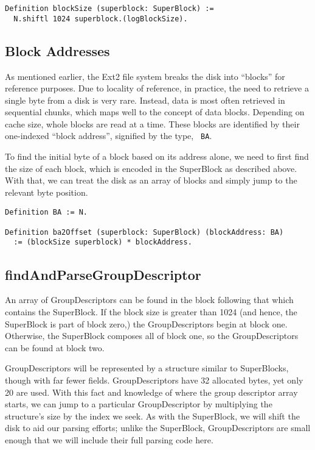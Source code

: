 \documentclass[nocopyrightspace]{sigplanconf}
\begin{document}
\begin{lstlisting}
Definition blockSize (superblock: SuperBlock) := 
  N.shiftl 1024 superblock.(logBlockSize).
\end{lstlisting}

\subsection{Block Addresses}

As mentioned earlier, the Ext2 file system breaks the disk into ``blocks'' for
reference purposes. Due to locality of reference, in practice, the need to
retrieve a single byte from a disk is very rare. Instead, data is most often
retrieved in sequential chunks, which maps well to the concept of data blocks.
Depending on cache size, whole blocks are read at a time. These blocks are
identified by their one-indexed ``block address'', signified by the type, {\tt
BA}. 

To find the initial byte of a block based on its address alone, we need to
first find the size of each block, which is encoded in the SuperBlock as
described above. With that, we can treat the disk as an array of blocks and
simply jump to the relevant byte position.

\begin{lstlisting}
Definition BA := N.

Definition ba2Offset (superblock: SuperBlock) (blockAddress: BA)
  := (blockSize superblock) * blockAddress.
\end{lstlisting}

\subsection{findAndParseGroupDescriptor}
An array of GroupDescriptors can be found in the block following that which
contains the SuperBlock. If the block size is greater than 1024 (and hence,
the SuperBlock is part of block zero,) the GroupDescriptors begin at block
one. Otherwise, the SuperBlock composes all of block one, so the
GroupDescriptors can be found at block two.

GroupDescriptors will be represented by a structure similar to SuperBlocks,
though with far fewer fields. GroupDescriptors have 32 allocated bytes, yet
only 20 are used. With this fact and knowledge of where the group descriptor
array starts, we can jump to a particular GroupDescriptor by multiplying the
structure's size by the index we seek. As with the SuperBlock, we will shift
the disk to aid our parsing efforts; unlike the SuperBlock, GroupDescriptors
are small enough that we will include their full parsing code here.
\end{document}
